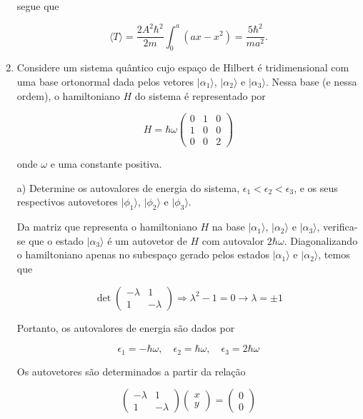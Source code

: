\begin{enumerate}[start=1,label={\bfseries Q\arabic*.}]
{segue que

$$
\langle T\rangle=\frac{2 A^{2} \hbar^{2}}{2 m} \int_{0}^{a}\left(a x-x^{2}\right)=\frac{5 \hbar^{2}}{m a^{2}}.
$$


}






\item Considere um sistema quântico cujo espaço de Hilbert é tridimensional com uma base ortonormal dada pelos vetores $| \alpha_{1} \rangle$, $| \alpha_{2} \rangle$ e $| \alpha_{3} \rangle$. Nessa base (e nessa ordem), o hamiltoniano $H$ do sistema é representado por

\[ H = \hbar \omega \left( \begin{array}{ccc}
0 & 1 & 0 \\
1 & 0 & 0 \\
0 & 0 & 2 \end{array} \right)\]

onde $\omega$ e uma constante positiva.



a) Determine os autovalores de energia do sistema, $\epsilon_{1} < \epsilon_{2} < \epsilon_{3}$, e os seus respectivos autovetores  $| \phi_{1} \rangle$, $| \phi_{2} \rangle$ e $| \phi_{3} \rangle$.

{\color{red}

Da matriz que representa o hamiltoniano $H$ na base $| \alpha_{1} \rangle$, $| \alpha_{2} \rangle$ e $| \alpha_{3} \rangle$, verifica-se que o estado $| \alpha_{3} \rangle$ é um autovetor de $H$ com autovalor $2\hbar\omega$. Diagonalizando o hamiltoniano apenas no subespaço gerado pelos estados $| \alpha_{1} \rangle$ e $| \alpha_{2} \rangle$, temos que

$$
\operatorname{det}\left(\begin{array}{cc}
{-\lambda} & {1} \\
{1} & {-\lambda}
\end{array}\right) \Rightarrow \lambda^{2}-1=0 \rightarrow \lambda=\pm 1
$$

Portanto, os autovalores de energia são dados por

$$
\epsilon_{1}=-\hbar \omega, \quad \epsilon_{2}=\hbar \omega, \quad \epsilon_{3}=2 \hbar \omega
$$

Os autovetores são determinados a partir da relação

$$
\left(\begin{array}{cc}
{-\lambda} & {1} \\
{1} & {-\lambda}
\end{array}\right)\left(\begin{array}{l}
{x} \\
{y}
\end{array}\right)=\left(\begin{array}{l}
{0} \\
{0}
\end{array}\right)
$$

}
\end{enumerate}
